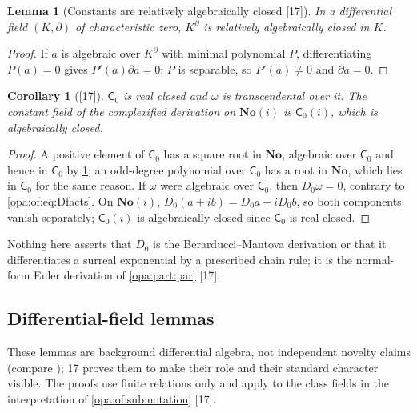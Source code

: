 \documentclass[11pt,oneside]{article}
\numberwithin{equation}{section}
\newtheorem{lemma}[lemma]{Lemma}
\newtheorem{corollary}[corollary]{Corollary}
\theoremstyle{definition}
\theoremstyle{remark}
\newcommand{\No}{\mathbf{No}}
\newcommand{\SC}{\mathbf{No}(i)}
\newcommand{\src}[1]{\textup{\textsf{\small[#1]}}}
\begin{document}
\begin{lemma}[Constants are relatively algebraically closed \src{17}]\label{opa:of:lem:relalg}
In a differential field $(K,\partial)$ of characteristic zero, $K^\partial$ is relatively algebraically closed in $K$.
\end{lemma}
\begin{proof}
If $a$ is algebraic over $K^\partial$ with minimal polynomial $P$, differentiating $P(a)=0$ gives $P'(a)\partial a=0$; $P$ is
separable, so $P'(a)\ne0$ and $\partial a=0$.
\end{proof}

\begin{corollary}[\src{17}]\label{opa:of:cor:realclosed}
$\mathsf C_0$ is real closed and $\omega$ is transcendental over it. The constant field of the complexified derivation on
$\SC$ is $\mathsf C_0(i)$, which is algebraically closed.
\end{corollary}
\begin{proof}
A positive element of $\mathsf C_0$ has a square root in $\No$, algebraic over $\mathsf C_0$ and hence in $\mathsf C_0$ by
\cref{opa:of:lem:relalg}; an odd-degree polynomial over $\mathsf C_0$ has a root in $\No$, which lies in $\mathsf C_0$ for the
same reason. If $\omega$ were algebraic over $\mathsf C_0$, then $D_0\omega=0$, contrary to \eqref{opa:of:eq:Dfacts}. On
$\SC$, $D_0(a+ib)=D_0a+iD_0b$, so both components vanish separately; $\mathsf C_0(i)$ is algebraically closed since $\mathsf C_0$
is real closed.
\end{proof}

Nothing here asserts that $D_0$ is the Berarducci--Mantova derivation or that it differentiates a surreal exponential by a
prescribed chain rule; it is the normal-form Euler derivation of \cref{opa:part:par} \src{17}.

\subsection{Differential-field lemmas}\label{opa:of:sub:lemmas}

These lemmas are background differential algebra, not independent novelty claims (compare \cite{Kolchin,Ng}); 17 proves
them to make their role and their standard character visible. The proofs use finite relations only and apply to the class
fields in the interpretation of \cref{opa:of:sub:notation} \src{17}.
\end{document}
